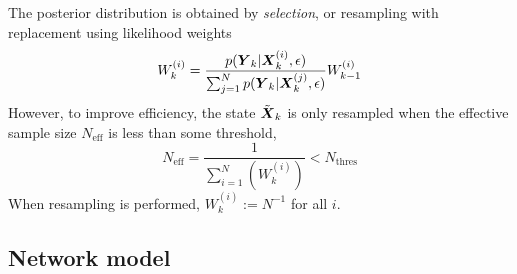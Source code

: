 The posterior distribution is obtained by \emph{selection},
or resampling with replacement using likelihood weights
\begin{equation*}
W_k^{(i)} = \frac{p(\mbox{$\boldsymbol{Y}$}_k | \mbox{$\boldsymbol{X}$}_k^{(i)}, \epsilon)}{
    \sum_{j=1}^N p(\mbox{$\boldsymbol{Y}$}_k | \mbox{$\boldsymbol{X}$}_k^{(j)}, \epsilon)
} 
W_{k-1}^{(i)} 
\end{equation*}
However, to improve efficiency, the state $\tilde {\mbox{$\boldsymbol{X}$}}_k$ is only resampled
when the effective sample size 
$N_{\text{eff}}$ is less than some threshold,
\begin{equation*}
N_{\text{eff}} = \frac{1}{\sum_{i=1}^N (W_k^{(i)})} < N_{\text{thres}}
\end{equation*}
When resampling is performed, $W_k^{(i)} := N^{-1}$ for all $i$.


\subsection{Network model}
\label{sec:kf}





